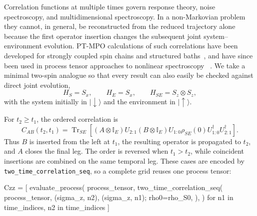 Correlation functions at multiple times govern response theory, noise spectroscopy, and multidimensional spectroscopy. 
In a non-Markovian problem they cannot, in general, be reconstructed from the reduced trajectory alone because the first operator insertion changes the subsequent joint system--environment evolution. 
PT-MPO calculations of such correlations have been developed for strongly coupled spin chains and structured baths~\cite{Fux2023TensorNetworkChains}, and have since been used in process tensor approaches to nonlinear spectroscopy ~\cite{deWit2025Spectroscopy}. 
We take a minimal two-spin analogue so that every result can also easily be checked against direct joint evolution,
%
\begin{equation}
    H_S=S_x,
    \qquad
    H_E=S_x,
    \qquad
    H_{SE}=S_z\otimes S_z,
    \label{eq:correlation-spin-model}
\end{equation}
%
with the system initially in $|\!\downarrow\rangle$ and the environment in $|\!\uparrow\rangle$.

For $t_2\geq t_1$, the ordered correlation is
%
\begin{equation}
    C_{AB}(t_2,t_1)
    =
    \operatorname{Tr}_{SE}\!\left[
        (A\otimes\mathbb I_E)U_{2:1}(B\otimes\mathbb I_E)
        U_{1:0}\rho_{SE}(0)U_{1:0}^{\dagger}U_{2:1}^{\dagger}
    \right].
    \label{eq:exact-two-time-correlation}
\end{equation}
%
Thus $B$ is inserted from the left at $t_1$, the resulting operator is propagated to $t_2$, and $A$ closes the final leg. 
The order is reversed when $t_1>t_2$, while coincident insertions are combined on the same temporal leg. 
These cases are encoded by \texttt{two\_time\_correlation\_seq}, so a complete grid reuses one process tensor:
%
\begin{juliacode}[
    caption={Two-time correlation grid from one stored process tensor.},
    label={lst:workflow-correlations-grid},
]
Czz = [
    evaluate_process(
        process_tensor,
        two_time_correlation_seq(
            process_tensor, (sigma_z, n2), (sigma_z, n1);
            rho0=rho_S0,
        ),
    )
    for n1 in time_indices, n2 in time_indices
]
\end{juliacode}
%

